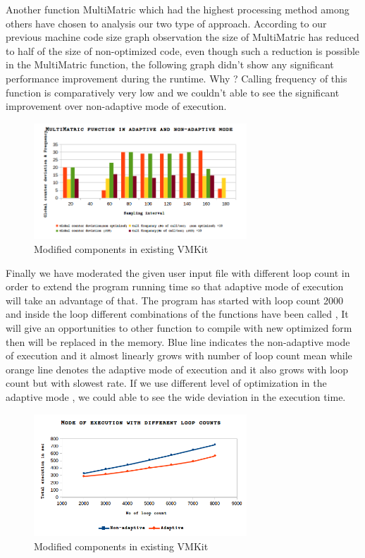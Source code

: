 Another function MultiMatric which had the highest processing method among others have chosen to analysis our two type of approach.  According to our previous machine code size graph observation the size of MultiMatric has reduced to half of the size of non-optimized code, even though such a reduction is possible in the MultiMatric function,  the following graph didn't show any significant  performance improvement during the runtime. Why ? Calling frequency of this function is  comparatively very low and we couldn't able to see the 
significant improvement over non-adaptive mode of execution.
\begin{figure}[ht!]
\centering
\includegraphics[width=80mm]{graph3.png}
\caption{\small Modified components in existing VMKit}
\label{fig:matrixmul}
\end{figure}

Finally we have moderated the given user input file with different loop count in order to extend the program running time so that adaptive mode of execution will take an advantage of that. The program has started with loop count 2000 and inside the loop different combinations of the functions have been called , It will give an opportunities to other function to compile with new optimized form then will be replaced in the memory.  Blue line indicates the non-adaptive mode of execution and it almost linearly grows with number of loop count mean while orange line denotes the adaptive mode of execution and it also grows with loop count but with slowest rate. If we use different level of optimization in the adaptive mode , we could able to see the wide deviation in the execution time.
\begin{figure}[ht!]
\centering
\includegraphics[width=80mm]{graph4.png}
\caption{\small Modified components in existing VMKit}
\label{fig:totalexecutiontime}
\end{figure}
